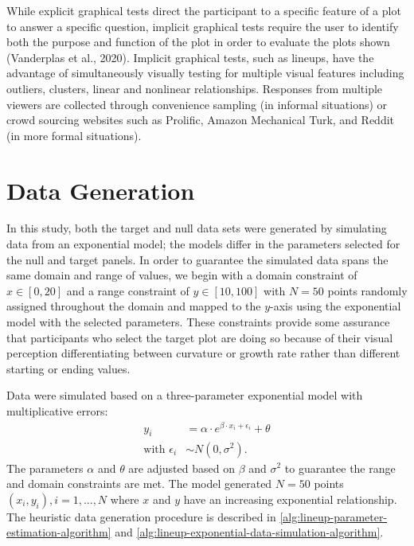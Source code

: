 \documentclass[print]{nuthesis}
\begin{document}
While explicit graphical tests direct the participant to a specific feature of a plot to answer a specific question, implicit graphical tests require the user to identify both the purpose and function of the plot in order to evaluate the plots shown (Vanderplas et al., 2020).
Implicit graphical tests, such as lineups, have the advantage of simultaneously visually testing for multiple visual features including outliers, clusters, linear and nonlinear relationships. Responses from multiple viewers are collected through convenience sampling (in informal situations) or crowd sourcing websites such as Prolific, Amazon Mechanical Turk, and Reddit (in more formal situations).

\hypertarget{data-generation}{%
\section{Data Generation}\label{data-generation}}

In this study, both the target and null data sets were generated by simulating data from an exponential model; the models differ in the parameters selected for the null and target panels.
In order to guarantee the simulated data spans the same domain and range of values, we begin with a domain constraint of \(x\in [0,20]\) and a range constraint of \(y\in [10,100]\) with \(N = 50\) points randomly assigned throughout the domain and mapped to the \(y\)-axis using the exponential model with the selected parameters.
These constraints provide some assurance that participants who select the target plot are doing so because of their visual perception differentiating between curvature or growth rate rather than different starting or ending values.

Data were simulated based on a three-parameter exponential model with multiplicative errors:
\begin{align}
y_i & = \alpha\cdot e^{\beta\cdot x_i + \epsilon_i} + \theta \\
\text{with } \epsilon_i & \sim N(0, \sigma^2). \nonumber
\end{align}
The parameters \(\alpha\) and \(\theta\) are adjusted based on \(\beta\) and \(\sigma^2\) to guarantee the range and domain constraints are met.
The model generated \(N = 50\) points \((x_i, y_i), i = 1,...,N\) where \(x\) and \(y\) have an increasing exponential relationship.
The heuristic data generation procedure is described in \cref{alg:lineup-parameter-estimation-algorithm} and \cref{alg:lineup-exponential-data-simulation-algorithm}.
\end{document}
